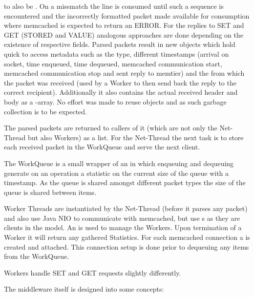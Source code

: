     to also be . On a missmatch the line is consumed until such a sequence is
    encountered and the incorrectly formatted packet made available for consumption where memcached is expected to
    return an ERROR.  For the replies to SET and GET (STORED and VALUE) analogous approaches are done depending on the
    existence of respective fields.\newline
    Parsed packets result in new objects which hold quick to access metadata such as the type, different timestamps
    (arrival on socket, time enqueued, time dequeued, memcached communication start, memcached communication stop and
    sent reply to memtier) and the  from which the packet was received (used by a Worker to then send
    back the reply to the correct recipient). Additionally it also contains the actual received header and body as a
    -array. No effort was made to reuse objects and as such garbage collection is to be expected.

    The parsed packets are returned to callers of it (which are not only the Net-Thread but also Workers) as a list. For
    the Net-Thread the next task is to store each received packet in the WorkQueue and serve the next client.

    The WorkQueue is a small wrapper of an  in which enqueuing and dequeuing generate on an
    operation a statistic on the current size of the queue with a timestamp. As the queue is shared amongst different
    packet types the size of the queue is shared between items.



    Worker Threads are instantiated by the Net-Thread (before it parses any packet) and also use Java NIO to communicate
    with memcached, but use s as they are clients in the model. An  is used to
    manage the Workers. Upon termination of a Worker it will return any gathered Statistics. For each memcached
    connection a  is created and attached. This connection setup is done prior to dequeuing any items
    from the WorkQueue.





    Workers handle SET and GET requests slightly differently.

    The middleware itself is designed into some concepts:

